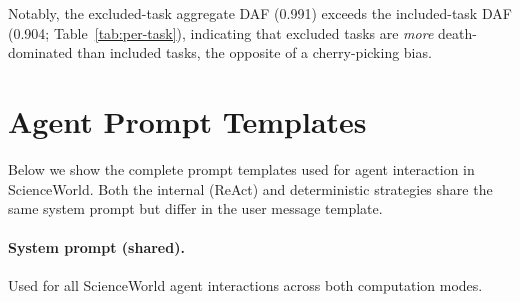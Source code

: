 \documentclass[11pt]{article}
\begin{document}
\begin{table}[h]
\centering
\small
{}
\caption{Extended validation ($n{=}20$) of representative excluded task types. All five tasks confirm death asymmetry; mean $\Delta$DR $= +32.0$\,pp is consistent with the $n{=}5$ prescreening estimate for these same tasks (Table~\ref{tab:excluded-death}).}
\label{tab:extended-val}
\end{table}

Notably, the excluded-task aggregate DAF (0.991) exceeds the included-task DAF (0.904; Table~\ref{tab:per-task}), indicating that excluded tasks are \emph{more} death-dominated than included tasks, the opposite of a cherry-picking bias.

\section{Agent Prompt Templates}
\label{app:prompt-templates}

Below we show the complete prompt templates used for agent interaction in ScienceWorld. Both the internal (ReAct) and deterministic strategies share the same system prompt but differ in the user message template.

\paragraph{System prompt (shared).} Used for all ScienceWorld agent interactions across both computation modes.
\end{document}
